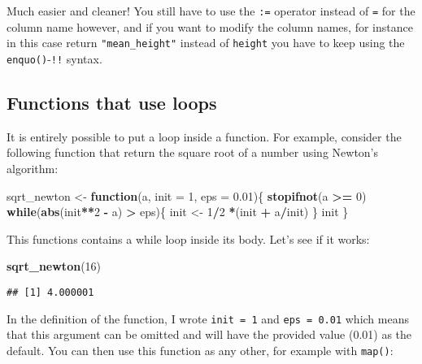 \documentclass[
]{article}
\newenvironment{Shaded}{\begin{snugshade}}{\end{snugshade}}
\newcommand{\ControlFlowTok}[1]{\textcolor[rgb]{0.13,0.29,0.53}{\textbf{#1}}}
\newcommand{\DataTypeTok}[1]{\textcolor[rgb]{0.13,0.29,0.53}{#1}}
\newcommand{\DecValTok}[1]{\textcolor[rgb]{0.00,0.00,0.81}{#1}}
\newcommand{\FloatTok}[1]{\textcolor[rgb]{0.00,0.00,0.81}{#1}}
\newcommand{\KeywordTok}[1]{\textcolor[rgb]{0.13,0.29,0.53}{\textbf{#1}}}
\newcommand{\NormalTok}[1]{#1}
\newcommand{\OperatorTok}[1]{\textcolor[rgb]{0.81,0.36,0.00}{\textbf{#1}}}
\newcommand{\StringTok}[1]{\textcolor[rgb]{0.31,0.60,0.02}{#1}}
\begin{document}
Much easier and cleaner! You still have to use the \texttt{:=} operator instead of \texttt{=} for the column name
however, and if you want to modify the column names, for instance in this
case return \texttt{"mean\_height"} instead of \texttt{height} you have to keep using the \texttt{enquo()}-\texttt{!!} syntax.

\hypertarget{functions-that-use-loops}{%
\subsection{Functions that use loops}\label{functions-that-use-loops}}

It is entirely possible to put a loop inside a function. For example, consider the following
function that return the square root of a number using Newton's algorithm:

\begin{Shaded}
\begin{Highlighting}[]
\NormalTok{sqrt\_newton \textless{}{-}}\StringTok{ }\ControlFlowTok{function}\NormalTok{(a, }\DataTypeTok{init =} \DecValTok{1}\NormalTok{, }\DataTypeTok{eps =} \FloatTok{0.01}\NormalTok{)\{}
    \KeywordTok{stopifnot}\NormalTok{(a }\OperatorTok{\textgreater{}=}\StringTok{ }\DecValTok{0}\NormalTok{)}
    \ControlFlowTok{while}\NormalTok{(}\KeywordTok{abs}\NormalTok{(init}\OperatorTok{**}\DecValTok{2} \OperatorTok{{-}}\StringTok{ }\NormalTok{a) }\OperatorTok{\textgreater{}}\StringTok{ }\NormalTok{eps)\{}
\NormalTok{        init \textless{}{-}}\StringTok{ }\DecValTok{1}\OperatorTok{/}\DecValTok{2} \OperatorTok{*}\NormalTok{(init }\OperatorTok{+}\StringTok{ }\NormalTok{a}\OperatorTok{/}\NormalTok{init)}
\NormalTok{    \}}
\NormalTok{    init}
\NormalTok{\}}
\end{Highlighting}
\end{Shaded}

This functions contains a while loop inside its body. Let's see if it works:

\begin{Shaded}
\begin{Highlighting}[]
\KeywordTok{sqrt\_newton}\NormalTok{(}\DecValTok{16}\NormalTok{)}
\end{Highlighting}
\end{Shaded}

\begin{verbatim}
## [1] 4.000001
\end{verbatim}

In the definition of the function, I wrote \texttt{init\ =\ 1} and \texttt{eps\ =\ 0.01} which means that this
argument can be omitted and will have the provided value (0.01) as the default. You can then use
this function as any other, for example with \texttt{map()}:
\end{document}
